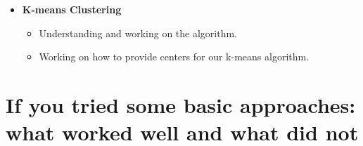 \documentclass[11pt]{exam}
\begin{document}
\begin{itemize}
\begin{itemize}
\end{itemize}	

\item \textbf{K-means Clustering}
\begin{itemize}
\item  Understanding and working on the algorithm.
\item Working on how to provide centers for our k-means algorithm.
\end{itemize}


\end{itemize}

\section{ If you tried some basic approaches: what worked well and what did not }
\end{document}
